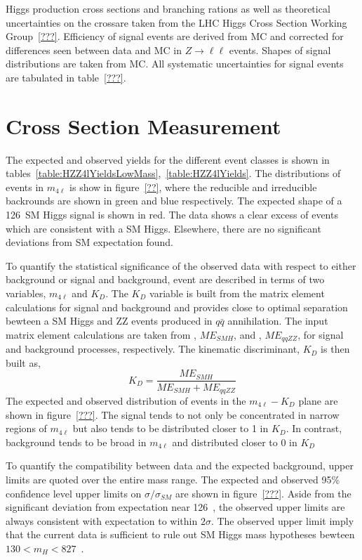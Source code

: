 Higgs production cross sections and branching rations as well 
as theoretical uncertainties on the crossare taken from the LHC 
Higgs Cross Section Working Group~\ref{???}.  Efficiency of 
signal events are derived from MC and corrected for differences
seen between data and MC in $Z\to\ell\ell$ events.  Shapes of 
signal distributions are taken from MC.  All systematic 
uncertainties for signal events are tabulated in table~\ref{???}.

\section{Cross Section Measurement}
\label{sec:HZZ4lxsec}

The expected and observed yields for the different event classes
is shown in tables~\ref{table:HZZ4lYieldsLowMass},~\ref{table:HZZ4lYields}.  
The distributions of events in $m_{4\ell}$ is show in figure~\ref{??},
where the reducible and irreducible backrounds are shown in green
and blue respectively.  The expected shape of a 126~\GeV SM Higgs
signal is shown in red.  The data shows a clear excess of events 
which are consistent with a SM Higgs.  Elsewhere, there are no
significant deviations from SM expectation found.  

To quantify the statistical significance of the observed data
with respect to either background or signal and background, event
are described in terms of two variables, $m_{4\ell}$ and $K_D$.
The $K_D$ variable is built from the matrix element calculations
for signal and background and provides close to optimal separation
bewteen a SM Higgs and ZZ events produced in $q\bar{q}$
annihilation.  The input matrix element calculations are taken
from \JHUGen, $ME_{SMH}$, and \MCFM, $ME_{qqZZ}$, for signal and 
background processes, respectively.  The kinematic discriminant, 
$K_D$ is then built as,
\begin{equation}
K_D = \frac{ME_{SMH}}{ME_{SMH}+ME_{qqZZ}}
\end{equation}
The expected and observed distribution of events in the 
$m_{4\ell}-K_D$ plane are shown in figure~\ref{???}.  The signal
tends to not only be concentrated in narrow regions of $m_{4\ell}$
but also tends to be distributed closer to 1 in $K_D$.  In 
contrast, background tends to be broad in $m_{4\ell}$ and
distributed closer to 0 in $K_D$

To quantify the compatibility between data and the expected
background, upper limits are quoted over the entire mass range.  
The expected and observed 95\% confidence level upper limits on
$\sigma/\sigma_{SM}$ are
shown in figure~\ref{???}.  Aside from the significant deviation
from expectation near 126~\GeV, the observed upper limits are 
always consistent with expectation to within $2\sigma$.  The
observed upper limit imply that the current data is sufficient
to rule out SM Higgs mass hypotheses bewteen $130<m_{H}<827$~\GeV.

